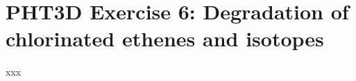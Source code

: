 \newpage
\section[PHT3D Exercise 6: Degradation of chlorinated ethenes and isotopes]{PHT3D Exercise 6: Degradation of chlorinated ethenes and isotopes}

xxx





